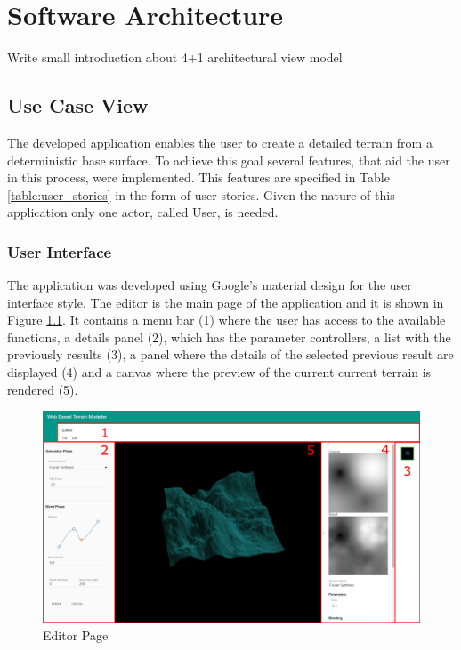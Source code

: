 \chapter{Software Architecture} \label{chap:software_architecture}

  \begin{notes}
  	\item Write small introduction about 4+1 architectural view model
  \end{notes}

  \section {Use Case View}
    
    The developed application enables the user to create a detailed terrain from a deterministic base surface. To achieve this goal several features, that aid the user in this process, were implemented. This features are specified in Table \ref{table:user_stories} in the form of user stories. Given the nature of this application only one actor, called User, is needed.
    
    
    
    
    \subsection {User Interface}
    
      The application was developed using Google's material design \cite{Google2016} for the user interface style. The editor is the main page of the application and it is shown in Figure \ref{fig:editor_page}. It contains a menu bar (1) where the user has access to the available functions, a details panel (2), which has the parameter controllers, a list with the previously results (3), a panel where the details of the selected previous result are displayed (4) and a canvas where the preview of the current current terrain is rendered (5).
      
      \begin{figure}[H]
      	\centering
      	\includegraphics[width=0.95\linewidth]{images/screenshots/editorWithBoxes.pdf}
      	\caption{Editor Page}
      	\label{fig:editor_page}
      \end{figure}
    
